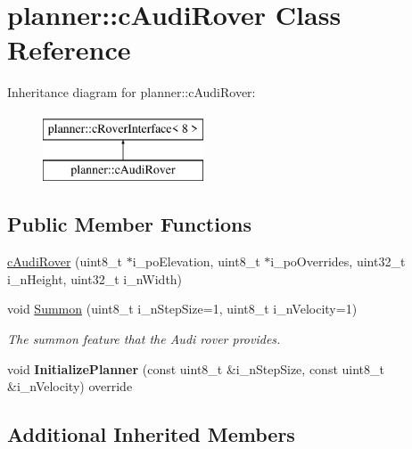 \hypertarget{classplanner_1_1c_audi_rover}{}\section{planner\+:\+:c\+Audi\+Rover Class Reference}
\label{classplanner_1_1c_audi_rover}
Inheritance diagram for planner\+:\+:c\+Audi\+Rover\+:\begin{figure}[H]
\begin{center}
\leavevmode
\includegraphics[height=2.000000cm]{classplanner_1_1c_audi_rover}
\end{center}
\end{figure}
\subsection*{Public Member Functions}
\begin{DoxyCompactItemize}
\item 
\mbox{\hyperlink{classplanner_1_1c_audi_rover_a433acb819672e065324dbbdb2a077ecb}{c\+Audi\+Rover}} (uint8\+\_\+t $\ast$i\+\_\+po\+Elevation, uint8\+\_\+t $\ast$i\+\_\+po\+Overrides, uint32\+\_\+t i\+\_\+n\+Height, uint32\+\_\+t i\+\_\+n\+Width)
\item 
\mbox{\label{classplanner_1_1c_audi_rover_a52c48afa0829f858c19d3ecf4940db21}} 
void \mbox{\hyperlink{classplanner_1_1c_audi_rover_a52c48afa0829f858c19d3ecf4940db21}{Summon}} (uint8\+\_\+t i\+\_\+n\+Step\+Size=1, uint8\+\_\+t i\+\_\+n\+Velocity=1)
\begin{DoxyCompactList}\small\item\em The summon feature that the Audi rover provides. \end{DoxyCompactList}\item 
\mbox{\label{classplanner_1_1c_audi_rover_a7a463160a532a99e06a98fce3df4d2c3}} 
void {\bfseries Initialize\+Planner} (const uint8\+\_\+t \&i\+\_\+n\+Step\+Size, const uint8\+\_\+t \&i\+\_\+n\+Velocity) override
\end{DoxyCompactItemize}
\subsection*{Additional Inherited Members}



